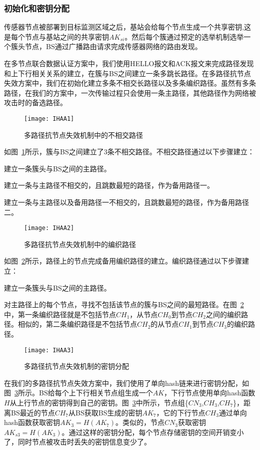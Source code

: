 \subsubsection{初始化和密钥分配}
传感器节点被部署到目标监测区域之后，基站会给每个节点生成一个共享密钥,这是每个节点与基站之间的共享密钥$AK_{si}$。然后每个簇通过预定的选举机制选举一个簇头节点，BS通过广播路由请求完成传感器网络的路由发现。

在多节点联合数据认证方案中，我们使用HELLO报文和ACK报文来完成路径发现和上下行相关关系的建立，在簇与BS之间建立一条多跳长路径。在多路径抗节点失效方案中，我们在初始化建立多条不相交长路径以及多条编织路径。虽然有多条路径，在我们的方案中，一次传输过程只会使用一条主路径，其他路径作为网络被攻击时的备选路径。

\begin{figure}[htbp]
  \centering
  \texttt{[image: IHAA1]}
  \caption{多路径抗节点失效机制中的不相交路径}
  \label{fig:IHAA1}
\end{figure}
如图~\ref{fig:IHAA1}所示，簇与BS之间建立了3条不相交路径。不相交路径通过以下步骤建立：
\begin{compactitem}
  \item 建立一条簇头与BS之间的主路径。
  \item 建立一条与主路径不相交的，且跳数最短的路径，作为备用路径一。
  \item 建立一条与主路径以及备用路径一不相交的，且跳数最短的路径，作为备用路径二。
\end{compactitem}

\begin{figure}[htbp]
  \centering
  \texttt{[image: IHAA2]}
  \caption{多路径抗节点失效机制中的编织路径}
  \label{fig:IHAA2}
\end{figure}
如图~\ref{fig:IHAA2}所示，路径上的节点完成备用编织路径的建立。编织路径通过以下步骤建立：
\begin{compactitem}
  \item 建立一条簇头与BS之间的主路径。
  \item 对主路径上的每个节点，寻找不包括该节点的簇与BS之间的最短路径。在图~\ref{fig:IHAA2} 中，第一条编织路径就是不包括节点$CH_1$，从节点$CH_0$到节点$CH_2$之间的编织路径。相似的，第二条编织路径是不包括节点$CH_2$的从节点$CH_1$到节点$CH_3$的编织路径。
\end{compactitem}

\begin{figure}[htbp]
  \centering
  \texttt{[image: IHAA3]}
  \caption{多路径抗节点失效机制的密钥分配}
  \label{fig:IHAA3}
\end{figure}
在我们的多路径抗节点失效方案中，我们使用了单向hash链来进行密钥分配，如图~\ref{fig:IHAA3}所示。BS给每个上下行相关节点组生成一个$AK$，下行节点使用单向hash函数$H$从上行节点的密钥得到自己的密钥。图~\ref{fig:IHAA3}中所示，节点组\{$CN_3$,$CH_3$,$CH_7$\}，距离BS最近的节点$CH_7$从BS获取BS生成的密钥$AK_7$，它的下行节点$CH_3$通过单向hash函数获取密钥$AK_3=H(AK_7)$。类似的，节点$CN_3$获取密钥$AK_{s3}=H(AK_3)$。通过这样的密钥分配，每个节点存储密钥的空间开销变小了，同时节点被攻击时丢失的密钥信息变少了。
